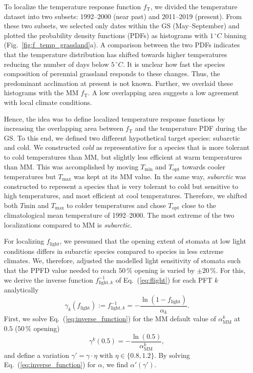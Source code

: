 \documentclass[bg, manuscript]{copernicus}
\begin{document}
To localize the temperature response function $f_\mathrm{T}$, we divided the temperature dataset into two subsets: 1992--2000 (near past) and 2011--2019 (present). From these two subsets, we selected only dates within the GS (May--September) and plotted the probability density functions (PDFs) as histograms with $1\,\unit{^\circ C}$ binning (Fig.~\ref{fig:f_temp_grassland}a). A comparison between the two PDFs indicates that the temperature distribution has shifted towards higher temperatures reducing the number of days below $5\,\unit{^\circ C}$. It is unclear how fast the species composition of perennial grassland responds to these changes. Thus, the predominant acclimation at present is not known. Further, we overlaid these histograms with the MM $f_\mathrm{T}$. A low overlapping area suggests a low agreement with local climate conditions. 

Hence, the idea was to define localized temperature response functions by increasing the overlapping area between $f_\mathrm{T}$ and the temperature PDF during the GS. To this end, we defined two different hypothetical target species: subarctic and cold. We constructed \emph{cold} as representative for a species that is more tolerant to cold temperatures than MM, but slightly less efficient at warm temperatures than MM. This was accomplished by moving $T_\mathrm{min}$ and $T_\mathrm{opt}$ towards cooler temperatures but $T_\mathrm{max}$ was kept at its MM value. In the same way, \emph{subarctic} was constructed to represent a species that is very tolerant to cold but sensitive to high temperatures, and most efficient at cool temperatures. Therefore, we shifted both $T\mathrm{min}$ and $T_\mathrm{max}$ to colder temperatures and chose $T_\mathrm{opt}$ close to the climatological mean temperature of 1992--2000. The most extreme of the two localizations compared to MM is \emph{subarctic}.

For localizing $f_\mathrm{light}$, we presumed that the opening extent of stomata at low light conditions differs in subarctic species compared to species in less extreme climates. We, therefore, adjusted the modelled light sensitivity of stomata such that the PPFD value needed to reach $50\,\unit{\%}$ opening is varied by $\pm 20\,\unit{\%}$. For this, we derive the inverse function $f_{\mathrm{light},k}^{-1}$ of Eq.~(\ref{eq:flight}) for each PFT $k$ analytically
%
\begin{equation}
  \gamma_k(f_\mathrm{light}) := f_{\mathrm{light}, k}^{-1} = -\frac{\ln(1-f_\mathrm{light})}{\alpha_k}.
  \label{eq:inverse_function}
\end{equation}
%
First, we solve Eq.~(\ref{eq:inverse_function}) for the MM default value of $\alpha_\mathrm{MM}^k$ at $0.5$ ($50\,\%$ opening)
\begin{equation}
  \gamma^k(0.5) = -\frac{\ln(0.5)}{\alpha_\mathrm{MM}^k},
  \label{eq:inverse_function_halfway}
\end{equation}
and define a variation $\gamma' = \gamma \cdot \eta$ with $\eta \in \{0.8, 1.2\}$. By solving Eq.~(\ref{eq:inverse_function}) for $\alpha$, we find $\alpha'(\gamma')$. 
\end{document}

